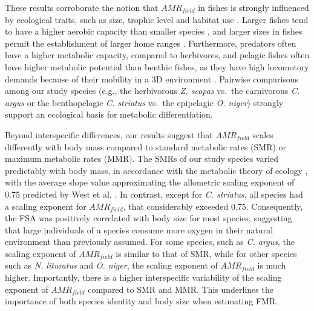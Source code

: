 \documentclass[
]{article}
\begin{document}
These results corroborate the notion that \(AMR_{field}\) in fishes is
strongly influenced by ecological traits, such as size, trophic level
and habitat use \citep{Brown2004, Killen2016, Nash2015}. Larger fishes
tend to have a higher aerobic capacity than smaller species
\citep{Brown2004}, and larger sizes in fishes permit the establishment
of larger home ranges \citep{Nash2015}. Furthermore, predators often
have a higher metabolic capacity, compared to herbivores, and pelagic
fishes often have higher metabolic potential than benthic fishes, as
they have high locomotory demands because of their mobility in a 3D
environment \citep{Killen2016, Nash2015}. Pairwise comparisons among our
study species (e.g., the herbivorous \emph{Z. scopas} vs.~the
carnivorous \emph{C. argus} or the benthopelagic \emph{C. striatus}
vs.~the epipelagic \emph{O. niger}) strongly support an ecological basis
for metabolic differentiation.

Beyond interspecific differences, our results suggest that
\(AMR_{field}\) scales differently with body mass compared to standard
metabolic rates (SMR) or maximum metabolic rates (MMR). The SMRs of our
study species varied predictably with body mass, in accordance with the
metabolic theory of ecology \citep{Brown2004}, with the average slope
value approximating the allometric scaling exponent of 0.75 predicted by
West et al. \citep{West1997}. In contrast, except for \emph{C.
striatus}, all species had a scaling exponent for \(AMR_{field}\), that
considerably exceeded 0.75. Consequently, the FSA was positively
correlated with body size for most species, suggesting that large
individuals of a species consume more oxygen in their natural
environment than previously assumed. For some species, such as \emph{C.
argus}, the scaling exponent of \(AMR_{field}\) is similar to that of
SMR, while for other species such as \emph{N. lituratus} and \emph{O.
niger}, the scaling exponent of \(AMR_{field}\) is much higher.
Importantly, there is a higher interspecific variability of the scaling
exponent of \(AMR_{field}\) compared to SMR and MMR. This underlines the
importance of both species identity and body size when estimating FMR.
\end{document}
